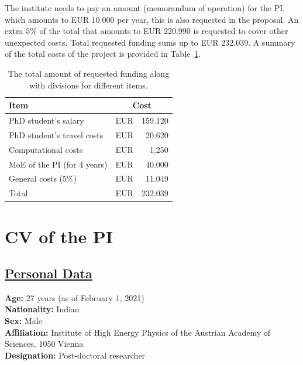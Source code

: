 \documentclass[a4paper,11pt]{article}
\begin{document}
The institute needs to pay an amount (memorandum of operation) for the PI, which amounts to EUR 10.000 per year, 
this is also requested in the proposal.
An extra $5\%$ of the total that amounts to EUR 220.990 is requested to cover other unexpected costs.  
Total requested funding sums up to EUR 232.039.  
A summary of the total costs of the project is provided in Table~\ref{Tab:Total_cost}.
\begin{table}
\caption{The total amount of requested funding along with divisions for different items.}
\begin{center}
{\renewcommand{\arraystretch}{1.3}
\begin{tabular}{m{6 cm}| r r}
Item & \multicolumn{2}{c}{ Cost } \\
\hline 
PhD student's salary & EUR & 159.120  \\
PhD student's travel costs & EUR & 20.620 \\
Computational costs & EUR & 1.250 \\
MoE of the PI (for 4 years) & EUR & 40.000 \\
\hline
General costs ($5\%$) & EUR & 11.049  \\
\hline
Total & EUR & 232.039
\end{tabular}
}
\end{center}
\label{Tab:Total_cost}
\end{table}

\newpage
\clearpage

\section{CV of the PI}

\subsection*{\underline{Personal Data}}

\textbf{Age:} 27 years (as of February 1, 2021)\\
\textbf{Nationality:} Indian \\
\textbf{Sex:} Male \\
\textbf{Affiliation:} Institute of High Energy Physics of the Austrian Academy of Sciences, 1050 Vienna \\
\textbf{Designation:} Post-doctoral researcher 

\end{document}
